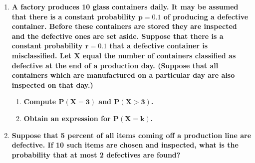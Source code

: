 \documentclass[10pt, oneside]{article}
\begin{document}
\begin{enumerate}[label=4.\arabic*]
For $L > 1$, $\alpha > 0$. Since $x < L$, it follows that $x / (L-x) \geq 0$, and so $f(x) \geq 0$, thus satisfying the Kolmogorov axioms to be a pdf. Calculating the probability that the ratio of the short to long segment is less than $1/4$ gives us

\begin{align*}
P\Big( \frac{x}{L-x} < 1/4 \Big) &= \alpha \int^{1/4}_0 \frac{x}{L-x} dx \\
&= \alpha [L-x-L \ln (L-x)] \Big|^{1/4}_0 \\
&= \alpha \Big[ \ln \Big( \Big( \frac{L}{L - 1/4} \Big)^L \Big) - \frac{1}{4} \Big] \\
&= \boxed{ \frac{ \ln \Big( \Big( \frac{L}{L - 1/4} \Big)^L \Big) - \frac{1}{4} }{ \ln \Big( \Big( \frac{L}{L-1} \Big)^L \Big) - 1 } }
\end{align*}

\item  \begin{tcolorbox}[
  colback=Cerulean!5!white,
  colframe=Cerulean!75!black]
\textbf{A factory produces 10 glass containers daily. It may be assumed that there is a constant probability $\bm{p = 0.1}$ of producing a defective container. Before these containers are stored they are inspected and the defective ones are set aside. Suppose that there is a constant probability $\bm{r = 0.1}$ that a defective container is misclassified. Let $\bm{X}$ equal the number of containers classified as defective at the end of a production day. (Suppose that all containers which are manufactured on a particular day are also inspected on that day.)}
\end{tcolorbox}

	\begin{enumerate}
	\item  \begin{tcolorbox}[
	  colback=Cerulean!5!white,
	  colframe=Cerulean!75!black]
	\textbf{Compute $\bm{P(X = 3)}$ and $\bm{P(X > 3)}$.}
	\end{tcolorbox}
	
	\item  \begin{tcolorbox}[
	  colback=Cerulean!5!white,
	  colframe=Cerulean!75!black]
	\textbf{Obtain an expression for $\bm{P(X = k)}$.}
	\end{tcolorbox}
	\end{enumerate}

\item  \begin{tcolorbox}[
  colback=Cerulean!5!white,
  colframe=Cerulean!75!black]
\textbf{Suppose that 5 percent of all items coming off a production line are defective. If 10 such items are chosen and inspected, what is the probability that at most 2 defectives are found?}
\end{tcolorbox}


\end{enumerate}
\end{document}
